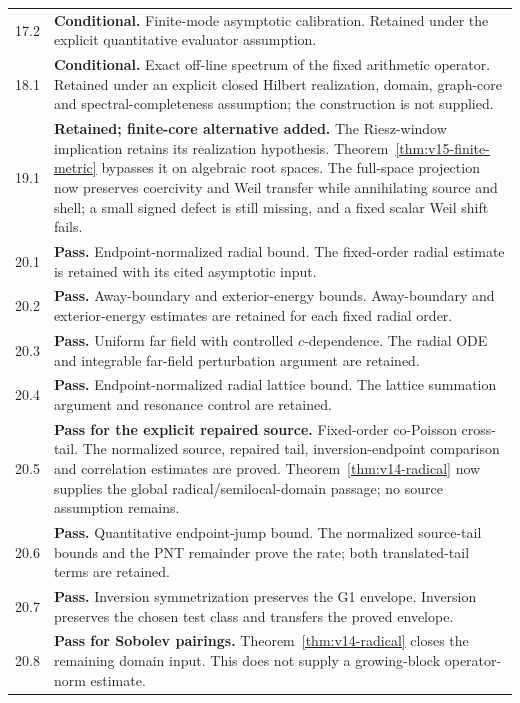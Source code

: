 \documentclass[11pt]{article}
\theoremstyle{remark}
\begin{document}
\begin{longtable}{@{}p{}p{}@{}}
17.2 & \textbf{Conditional.} Finite-mode asymptotic calibration. Retained under the explicit quantitative evaluator assumption. \\[4pt]
18.1 & \textbf{Conditional.} Exact off-line spectrum of the fixed arithmetic operator. Retained under an explicit closed Hilbert realization, domain, graph-core and spectral-completeness assumption; the construction is not supplied. \\[4pt]
19.1 & \textbf{Retained; finite-core alternative added.} The Riesz-window implication retains its realization hypothesis. Theorem~\ref{thm:v15-finite-metric} bypasses it on algebraic root spaces. The full-space projection now preserves coercivity and Weil transfer while annihilating source and shell; a small signed defect is still missing, and a fixed scalar Weil shift fails. \\[4pt]
20.1 & \textbf{Pass.} Endpoint-normalized radial bound. The fixed-order radial estimate is retained with its cited asymptotic input. \\[4pt]
20.2 & \textbf{Pass.} Away-boundary and exterior-energy bounds. Away-boundary and exterior-energy estimates are retained for each fixed radial order. \\[4pt]
20.3 & \textbf{Pass.} Uniform far field with controlled $c$-dependence. The radial ODE and integrable far-field perturbation argument are retained. \\[4pt]
20.4 & \textbf{Pass.} Endpoint-normalized radial lattice bound. The lattice summation argument and resonance control are retained. \\[4pt]
20.5 & \textbf{Pass for the explicit repaired source.} Fixed-order co-Poisson cross-tail. The normalized source, repaired tail, inversion-endpoint comparison and correlation estimates are proved. Theorem~\ref{thm:v14-radical} now supplies the global radical/semilocal-domain passage; no source assumption remains. \\[4pt]
20.6 & \textbf{Pass.} Quantitative endpoint-jump bound. The normalized source-tail bounds and the PNT remainder prove the rate; both translated-tail terms are retained. \\[4pt]
20.7 & \textbf{Pass.} Inversion symmetrization preserves the G1 envelope. Inversion preserves the chosen test class and transfers the proved envelope. \\[4pt]
20.8 & \textbf{Pass for Sobolev pairings.} Theorem~\ref{thm:v14-radical} closes the remaining domain input. This does not supply a growing-block operator-norm estimate. \\[4pt]

\end{longtable}
\end{document}
